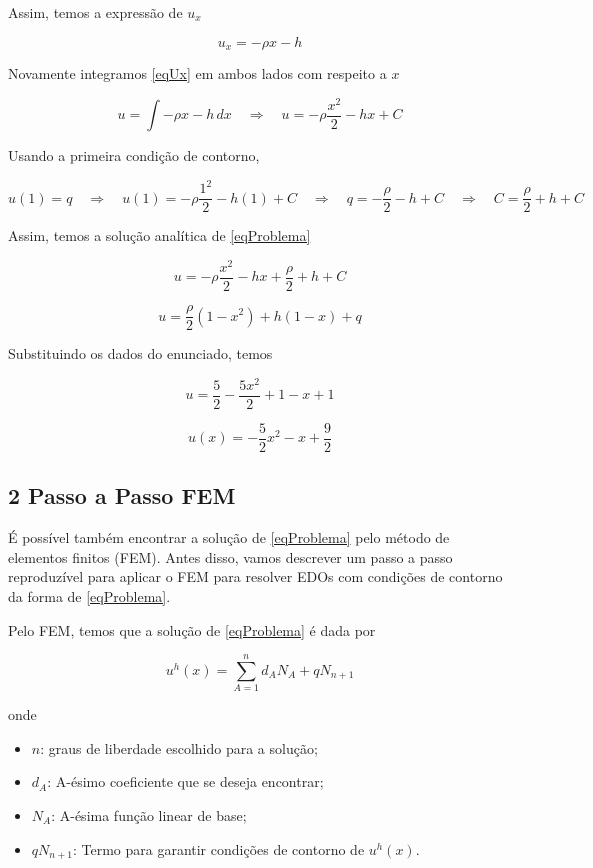 \documentclass[12pt]{scrartcl}
\newcommand{\logo}{\quad \Rightarrow \quad}
\begin{document}
Assim, temos a expressão de $u_x$

\begin{equation}\label{eqUx}
    u_x = - \rho x  - h
\end{equation}

Novamente integramos \eqref{eqUx} em ambos lados com respeito a $x$

\[
    u = \int -\rho x - h \, dx
    \logo
    u = - \rho \frac{x^2}{2} - hx + C
\]

Usando a primeira condição de contorno,

\[
    u(1) = q
    \logo
    u(1) = - \rho \frac{1^2}{2} - h(1) + C
    \logo
    q = - \frac{\rho}{2} - h + C
    \logo
    C = \frac{\rho}{2} + h + C
\]

Assim, temos a solução analítica de \eqref{eqProblema}

\[
    u = - \rho \frac{x^2}{2} - hx + \frac{\rho}{2} + h + C
\]

\begin{equation}\label{eqU}
    u = \frac{\rho}{2} \left(1 - x^2\right) + h\left(1 - x\right) + q
\end{equation}

Substituindo os dados do enunciado, temos

\[
    u = \frac{5}{2} - \frac{5x^2}{2} + 1 - x + 1
\]

\begin{equation}\label{eqUsubstituida}
    \boxed{u(x) = -\frac{5}{2}x^2 - x + \frac{9}{2}}
\end{equation}

\subsection*{2 Passo a Passo FEM}

É possível também encontrar a solução de \eqref{eqProblema} pelo método de elementos finitos (FEM).
Antes disso, vamos descrever um passo a passo
reproduzível para aplicar o FEM para resolver EDOs com condições de contorno da forma de \eqref{eqProblema}.
\newline

Pelo FEM, temos que a solução de \eqref{eqProblema} é dada por

\begin{equation}\label{eqUhFEM}
    u^h(x) = \sum_{A=1}^n d_AN_A + qN_{n+1}
\end{equation}

onde

\begin{itemize}
    \item $n$: graus de liberdade escolhido para a solução;
    \item $d_A$: A-ésimo coeficiente que se deseja encontrar;
    \item $N_A$: A-ésima função linear de base;
    \item $qN_{n+1}$: Termo para garantir condições de contorno de $u^h(x)$.
\end{itemize}
\end{document}
